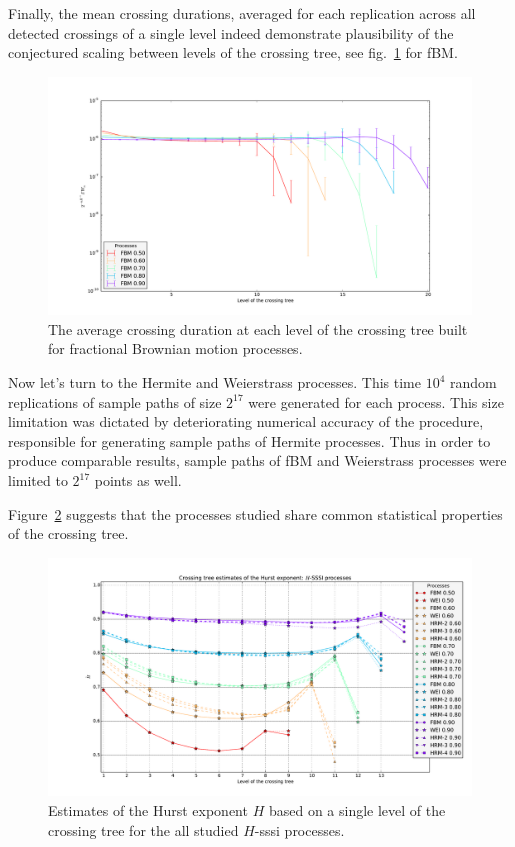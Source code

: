 \documentclass[a4paper]{article}
\begin{document}
Finally, the mean crossing durations, averaged for each replication across all detected
crossings of a single level indeed demonstrate plausibility of the conjectured scaling
between levels of the crossing tree, see fig.~\ref{fig:fbm_avg_crossing_durations} for fBM.
\begin{figure}[htb]\begin{center}
    \includegraphics[width=6in]{images/fbm_fig_08_med_1000-21}
    \caption{The average crossing duration at each level of the crossing tree built
    for fractional Brownian motion processes.}
\label{fig:fbm_avg_crossing_durations}
\end{center}\end{figure}

Now let's turn to the Hermite and Weierstrass processes. This time $10^4$ random
replications of sample paths of size $2^{17}$ were generated for each process.
This size limitation was dictated by deteriorating numerical accuracy of the procedure,
responsible for generating sample paths of Hermite processes. Thus in order to produce
comparable results, sample paths of fBM and Weierstrass processes were limited to $2^{17}$
points as well.

Figure~\ref{fig:all_hurst_crossing_tree} suggests that the processes studied share common
statistical properties of the crossing tree.
\begin{figure}[htb]\begin{center}
    \includegraphics[width=6in]{images/fig_05_med_10000-17}
    \caption{Estimates of the Hurst exponent $H$ based on a single level of the crossing tree for
    the all studied $H$-sssi processes.}
\label{fig:all_hurst_crossing_tree}
\end{center}\end{figure}
\end{document}
